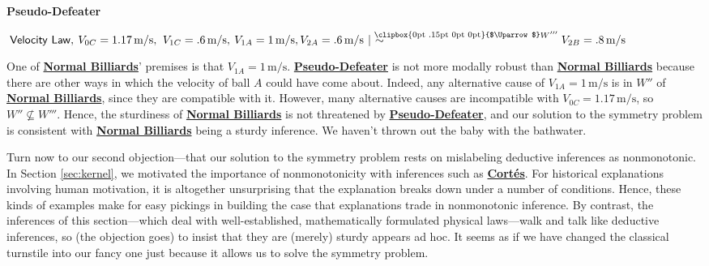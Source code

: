 \documentclass[natbib]{svjour3}                     %
\makeatletter
\newcommand{\Uuparrow}{%
	\raisebox{.2ex}{\clipbox{0pt .15pt 0pt 0pt}{$\Uparrow$}}
}
\newcommand{\nms}{%
	\mathbin{\mathpalette\@nms\expandafter}
}
\newcommand{\@nms}{\mid\joinrel\mkern-.5mu\sim}
\newcommand{\mrc}[1]{\mathbin{
		\mathchoice
		{\normalsize\hspace{.5mm}\nms^{\mkern-19mu\scriptsize\Uuparrow#1}\hspace{-.5mm}}
		{\normalsize\hspace{.5mm}\nms^{\mkern-19mu\scriptsize\Uuparrow#1}\hspace{-.5mm}}
		{\footnotesize\hspace{.5mm}\nms^{\mkern-13.5mu\fontsize{5.5}{0}\Uuparrow#1}}
		{\scriptsize\nms^{\mkern-10mu\tiny\Uuparrow#1}}
	}
}
\makeatother
\begin{document}
\noindent \label{eq:MRC_defeater2}\textbf{Pseudo-Defeater}\hspace{8.25mm}\begin{minipage}[t]{.8\textwidth}
	$\hspace{.5ex} \mathsf{Velocity\ Law},\hspace{.5ex} V_{0C} = 1.17 \,\text{m/s},\,\hspace{.5ex} V_{1C} = .6\,\text{m/s},\hspace{.5ex} V_{1A} = 1\,\text{m/s},\\ V_{2A} = .6\,\text{m/s} \mrc{W'''}\, V_{2B} = .8\,\text{m/s}$
\end{minipage}\vspace{3mm} 

\noindent One of \hyperref[eq:MRC_ballsforward]{\textbf{Normal Billiards}}' premises is that $V_{1A} = 1\,\text{m/s}$. \hyperref[eq:MRC_defeater2]{\textbf{Pseudo-Defeater}} is not more modally robust than \hyperref[eq:MRC_ballsforward]{\textbf{Normal Billiards}} because there are other ways in which the velocity of ball $A$ could have come about. Indeed, any alternative cause of $V_{1A} =1\,\text{m/s}$ is in $W''$ of \hyperref[eq:MRC_ballsforward]{\textbf{Normal Billiards}}, since they are compatible with it.  However, many alternative causes are incompatible with $V_{0C} = 1.17 \,\text{m/s}$, so $W'' \not\subseteq W'''$.  Hence, the sturdiness of \hyperref[eq:MRC_ballsforward]{\textbf{Normal Billiards}} is not threatened by \hyperref[eq:MRC_defeater2]{\textbf{Pseudo-Defeater}}, and our solution to the symmetry problem is consistent with \hyperref[eq:MRC_ballsforward]{\textbf{Normal Billiards}} being a sturdy inference. We haven't thrown out the baby with the bathwater.

Turn now to our second objection---that our solution to the symmetry problem rests on mislabeling deductive inferences as nonmonotonic. In Section \ref{sec:kernel}, we motivated the importance of nonmonotonicity with inferences such as \hyperref[Cortes]{\textbf{Cort\'{e}s}}. For historical explanations involving human motivation, it is altogether unsurprising that the explanation breaks down under a number of conditions. Hence, these kinds of examples make for easy pickings in building the case that explanations trade in nonmonotonic inference. By contrast, the inferences of this section---which deal with well-established, mathematically formulated physical laws---walk and talk like deductive inferences, so (the objection goes) to insist that they are (merely) sturdy appears ad hoc. It seems as if we have  changed the classical turnstile into our fancy one just because it allows us to solve the symmetry problem. 
\end{document}
